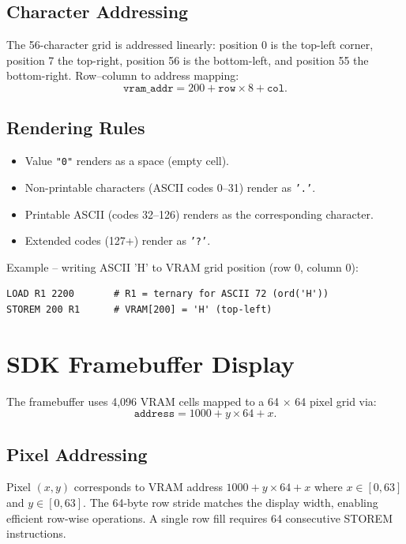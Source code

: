 \documentclass[10pt,a4paper,twoside]{book}
\begin{document}
\subsection{Character Addressing}

The 56-character grid is addressed linearly: position 0 is the top-left corner,
position 7 the top-right, position 56 is the bottom-left, and position 55 the
bottom-right. Row--column to address mapping:
\[
\texttt{vram\_addr} = 200 + \texttt{row} \times 8 + \texttt{col}.
\]

\subsection{Rendering Rules}

\begin{itemize}
    \item Value \texttt{"0"} renders as a space (empty cell).
    \item Non-printable characters (ASCII codes 0--31) render as \texttt{'.'}.
    \item Printable ASCII (codes 32--126) renders as the corresponding character.
    \item Extended codes (127+) render as \texttt{'?'}.
\end{itemize}

Example -- writing ASCII 'H' to VRAM grid position (row 0, column 0):
\begin{lstlisting}
LOAD R1 2200       # R1 = ternary for ASCII 72 (ord('H'))
STOREM 200 R1      # VRAM[200] = 'H' (top-left)
\end{lstlisting}

\section{SDK Framebuffer Display}

The framebuffer uses 4,096 VRAM cells mapped to a 64 $\times$ 64 pixel grid via:
\[
\texttt{address} = 1000 + y \times 64 + x.
\]

\subsection{Pixel Addressing}

Pixel $(x, y)$ corresponds to VRAM address $1000 + y \times 64 + x$ where
$x \in [0, 63]$ and $y \in [0, 63]$. The 64-byte row stride matches the display
width, enabling efficient row-wise operations. A single row fill requires 64
consecutive STOREM instructions.
\end{document}
